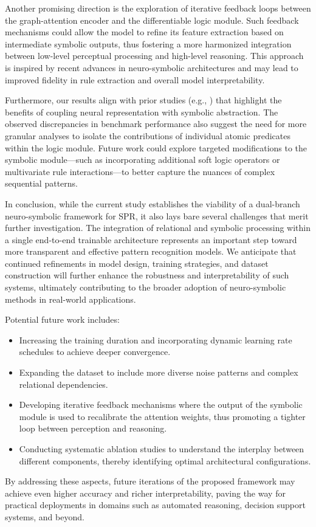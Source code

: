 \documentclass[11pt]{article}
\begin{document}
Another promising direction is the exploration of iterative feedback loops between the graph-attention encoder and the differentiable logic module. Such feedback mechanisms could allow the model to refine its feature extraction based on intermediate symbolic outputs, thus fostering a more harmonized integration between low-level perceptual processing and high-level reasoning. This approach is inspired by recent advances in neuro-symbolic architectures and may lead to improved fidelity in rule extraction and overall model interpretability.

Furthermore, our results align with prior studies (e.g., \cite{ref:rule_extraction1, ref:rule_extraction2}) that highlight the benefits of coupling neural representation with symbolic abstraction. The observed discrepancies in benchmark performance also suggest the need for more granular analyses to isolate the contributions of individual atomic predicates within the logic module. Future work could explore targeted modifications to the symbolic module—such as incorporating additional soft logic operators or multivariate rule interactions—to better capture the nuances of complex sequential patterns.

In conclusion, while the current study establishes the viability of a dual-branch neuro-symbolic framework for SPR, it also lays bare several challenges that merit further investigation. The integration of relational and symbolic processing within a single end-to-end trainable architecture represents an important step toward more transparent and effective pattern recognition models. We anticipate that continued refinements in model design, training strategies, and dataset construction will further enhance the robustness and interpretability of such systems, ultimately contributing to the broader adoption of neuro-symbolic methods in real-world applications.

Potential future work includes:
\begin{itemize}
    \item Increasing the training duration and incorporating dynamic learning rate schedules to achieve deeper convergence.
    \item Expanding the dataset to include more diverse noise patterns and complex relational dependencies.
    \item Developing iterative feedback mechanisms where the output of the symbolic module is used to recalibrate the attention weights, thus promoting a tighter loop between perception and reasoning.
    \item Conducting systematic ablation studies to understand the interplay between different components, thereby identifying optimal architectural configurations.
\end{itemize}

By addressing these aspects, future iterations of the proposed framework may achieve even higher accuracy and richer interpretability, paving the way for practical deployments in domains such as automated reasoning, decision support systems, and beyond.
\end{document}
